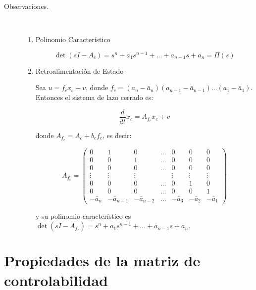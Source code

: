 \begin{description}
\item [Observaciones.] \mbox{}\\
\begin{enumerate}
\item Polinomio Característico

\begin{equation}
\det{(sI - A_c)} = s^n + a_1 s^{n-1} + \dots + a_{n-1} s + a_n = \Pi(s) \nonumber
\end{equation}

\item Retroalimentación de Estado

Sea $u = f_c x_c + v$, donde $f_c = (a_n - \bar{a}_n)(a_{n-1} - \bar{a}_{n-1})\dots(a_1 - \bar{a}_1)$. Entonces el sistema de lazo cerrado es:

\begin{equation}
\frac{d}{dt} x_c = A_{f_c} x_c + v
\end{equation}

donde $A_{f_c} = A_c + b_c f_c$, es decir:

\begin{equation}
A_{f_c} =
\begin{pmatrix}
0 & 1 & 0 & \dots & 0 & 0 & 0 \\
0 & 0 & 1 & \dots & 0 & 0 & 0 \\
0 & 0 & 0 & \dots & 0 & 0 & 0 \\
\vdots & \vdots & \vdots & & \vdots & \vdots & \vdots \\
0 & 0 & 0 & \dots & 0 & 1 & 0 \\
0 & 0 & 0 & \dots & 0 & 0 & 1 \\
-\bar{a}_{n} & -\bar{a}_{n-1} & -\bar{a}_{n-2} & \dots & -\bar{a}_{3} & -\bar{a}_{2} & -\bar{a}_{1}
\end{pmatrix}
\end{equation}

y su polinomio característico es $\det{(sI - A_{f_c})} = s^n + \bar{a}_1 s^{n-1} + \dots + \bar{a}_{n-1} s + \bar{a}_n$.

\end{enumerate}
\end{description}

\section{Propiedades de la matriz de controlabilidad}

